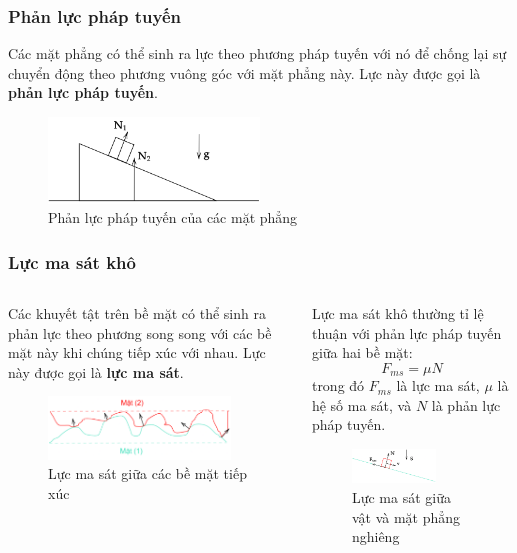 \begin{frame}
    \frametitle{Phản lực pháp tuyến}
Các mặt phẳng có thể sinh ra lực theo phương pháp tuyến với nó để chống lại sự chuyển động theo phương vuông góc với mặt phẳng này. Lực này được gọi là \textbf{phản lực pháp tuyến}.
\begin{figure}
\centering
\includegraphics[width=0.5\textwidth]{Slides/Figure/wedge.png}
\caption{Phản lực pháp tuyến của các mặt phẳng}
\end{figure}
\end{frame}

\begin{frame}
    \frametitle{Lực ma sát khô}
    \begin{columns}
    \begin{column}{0.5\textwidth}
    Các khuyết tật trên bề mặt có thể sinh ra phản lực theo phương song song với các bề mặt này khi chúng tiếp xúc với nhau. Lực này được gọi là \textbf{lực ma sát}.
    \begin{figure}
        \centering
        \includegraphics[width=0.9\textwidth]{Slides/Figure/friction.png}
        \caption{Lực ma sát giữa các bề mặt tiếp xúc}
    \end{figure}
    \end{column}
    \begin{column}{0.5\textwidth}
    Lực ma sát khô thường tỉ lệ thuận với phản lực pháp tuyến giữa hai bề mặt:
    \begin{equation}
        F_{ms} = \mu N
    \end{equation}
    trong đó \(F_{ms}\) là lực ma sát, \(\mu\) là hệ số ma sát, và \(N\) là phản lực pháp tuyến.
    \begin{figure}
        \centering
        \includegraphics[width=0.7\textwidth]{Slides/Figure/slope.png}
        \caption{Lực ma sát giữa vật và mặt phẳng nghiêng}
    \end{figure}
    \end{column}
    \end{columns}
\end{frame}